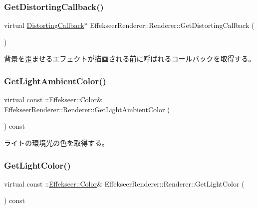 \subsubsection{\texorpdfstring{Get\+Distorting\+Callback()}{GetDistortingCallback()}}
{\footnotesize\ttfamily virtual \mbox{\hyperlink{class_effekseer_renderer_1_1_distorting_callback}{Distorting\+Callback}}$\ast$ Effekseer\+Renderer\+::\+Renderer\+::\+Get\+Distorting\+Callback (\begin{DoxyParamCaption}{ }\end{DoxyParamCaption})\hspace{0.3cm}{\ttfamily [pure virtual]}}



背景を歪ませるエフェクトが描画される前に呼ばれるコールバックを取得する。 

\mbox{\label{class_effekseer_renderer_1_1_renderer_a1454194ae4005f7a9d5a66f4f56c4972}} 
\subsubsection{\texorpdfstring{Get\+Light\+Ambient\+Color()}{GetLightAmbientColor()}}
{\footnotesize\ttfamily virtual const \+::\mbox{\hyperlink{struct_effekseer_1_1_color}{Effekseer\+::\+Color}}\& Effekseer\+Renderer\+::\+Renderer\+::\+Get\+Light\+Ambient\+Color (\begin{DoxyParamCaption}{ }\end{DoxyParamCaption}) const\hspace{0.3cm}{\ttfamily [pure virtual]}}



ライトの環境光の色を取得する。 

\mbox{\label{class_effekseer_renderer_1_1_renderer_af1ed44772dd362bd7dbed42823da0411}} 
\subsubsection{\texorpdfstring{Get\+Light\+Color()}{GetLightColor()}}
{\footnotesize\ttfamily virtual const \+::\mbox{\hyperlink{struct_effekseer_1_1_color}{Effekseer\+::\+Color}}\& Effekseer\+Renderer\+::\+Renderer\+::\+Get\+Light\+Color (\begin{DoxyParamCaption}{ }\end{DoxyParamCaption}) const\hspace{0.3cm}{\ttfamily [pure virtual]}}



